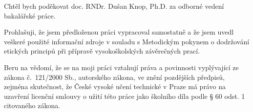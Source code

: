 \documentclass[czech,bachelor,unicode]{ctufit-thesis}
\theoremstyle{plain}
\theoremstyle{definition}
\theoremstyle{remark}
\numberwithin{theorem}{chapter}
\begin{document}

\frontmatter\frontmatterinit %


\thispagestyle{empty}\cleardoublepage\maketitle %

\imprintpage %

\tableofcontents %
\listoffigures %
\begingroup
\let\clearpage\relax
\listoflistings %
\endgroup

\begin{acknowledgmentpage}
	Chtěl bych poděkovat doc. RNDr. Dušan Knop, Ph.D. za odborné vedení bakalářské práce.
\end{acknowledgmentpage} 


\begin{declarationpage}
Prohlašuji, že jsem předloženou práci vypracoval samostatně a že jsem uvedl veškeré
použité informační zdroje v souladu s Metodickým pokynem o dodržování etických
principů při přípravě vysokoškolských závěrečných prací.

Beru na vědomí, že se na moji práci vztahují práva a povinnosti vyplývající ze zákona č.~121/2000 Sb., autorského zákona, ve znění pozdějších předpisů, zejména
skutečnost, že České vysoké učení technické v Praze má právo na uzavření licenční
smlouvy o užití této práce jako školního díla podle § 60 odst. 1 citovaného zákona.
\end{declarationpage}
\end{document}
